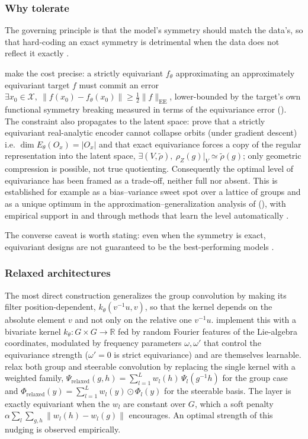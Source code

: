 \documentclass[mathematics,review,submit,moreauthors]{Definitions/mdpi}
\begin{document}
\subsubsection{Why tolerate}
The governing principle is that the model's symmetry should match the data's, so that hard-coding an exact symmetry is detrimental when the data does not reflect it exactly \citep{zhou2021,finzi2021anips,elsayed2020p3icml}.

\citet{wang2022p3icml} make the cost precise: a strictly equivariant $f_\theta$ approximating an approximately equivariant target $f$ must commit an error $\exists x_0\in \mathcal{X},\ \|f(x_0)-f_\theta(x_0)\|\ge \tfrac12\|f\|_{\mathrm{EE}}$, lower-bounded by the target's own functional symmetry breaking measured in terms of the equivariance error ().
The constraint also propagates to the latent space: \citet{ali2026} prove that a strictly equivariant real-analytic encoder cannot collapse orbits (under gradient descent) i.e. $\dim E_\theta(O_x)=|O_x|$ and that exact equivariance forces a copy of the regular representation into the latent space, $\exists (V,\tilde\rho),\ \rho_Z(g)|_V\simeq\tilde\rho(g)$; only geometric compression is possible, not true quotienting.
Consequently the optimal level of equivariance has been framed as a trade-off, neither full nor absent.
This is established for example as a bias--variance sweet spot over a lattice of groups \citep{huang2023} and as a unique optimum in the approximation--generalization analysis of \citet{petrache2023} (), with empirical support in \citep{wang2022p3icml,wang2024p4icml} and through methods that learn the level automatically \citep{ouderaa2022}.

\begin{Remark}
    The converse caveat is worth stating: even when the symmetry is exact, equivariant designs are not guaranteed to be the best-performing models \citep{lawrence2026,rygiel2026}.
\end{Remark}

\subsubsection{Relaxed architectures}
The most direct construction generalizes the group convolution by making its filter position-dependent, $k_\theta(v^{-1}u,v)$, so that the kernel depends on the absolute element $v$ and not only on the relative one $v^{-1}u$.
\citet{ouderaa2022} implement this with a bivariate kernel $k_\theta:G\times G\to\mathbb{R}$ fed by random Fourier features of the Lie-algebra coordinates, modulated by frequency parameters $\omega,\omega'$ that control the equivariance strength ($\omega'=0$ is strict equivariance) and are themselves learnable.
\citet{wang2022p3icml} relax both group and steerable convolution by replacing the single kernel with a weighted family, $\Psi_{\mathrm{relaxed}}(g,h)=\sum_{l=1}^{L}w_l(h)\,\Psi_l(g^{-1}h)$ for the group case and $\Phi_{\mathrm{relaxed}}(y)=\sum_{l=1}^{L}w_l(y)\odot\Phi_l(y)$ for the steerable basis.
The layer is exactly equivariant when the $w_l$ are constant over $G$, which a soft penalty $\alpha\sum_{l}\sum_{g,h}\|w_l(h)-w_l(g)\|$ encourages.
An optimal strength of this nudging is observed empirically.
\end{document}
